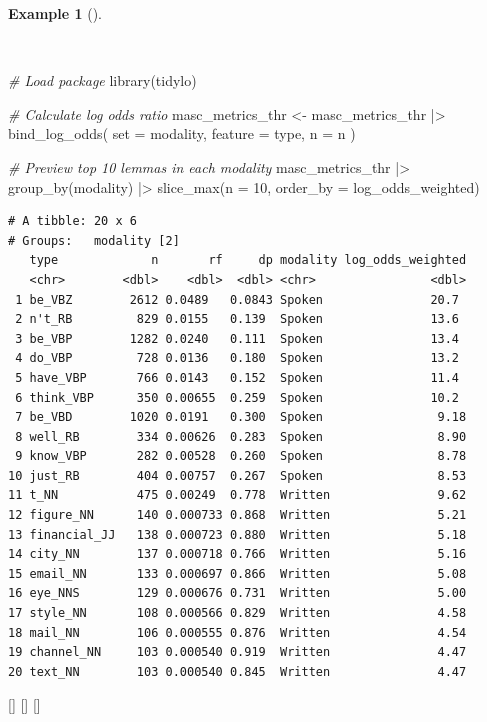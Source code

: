 \documentclass[
  letterpaper,
  krantz1]{latex/krantz-mod}
\newenvironment{Shaded}{\begin{snugshade}}{\end{snugshade}}
\newcommand{\AttributeTok}[1]{\textcolor[rgb]{0.00,0.00,0.00}{#1}}
\newcommand{\CommentTok}[1]{\textcolor[rgb]{0.00,0.00,0.00}{\textit{#1}}}
\newcommand{\DecValTok}[1]{\textcolor[rgb]{0.00,0.00,0.00}{#1}}
\newcommand{\FunctionTok}[1]{\textcolor[rgb]{0.00,0.00,0.00}{#1}}
\newcommand{\NormalTok}[1]{\textcolor[rgb]{0.00,0.00,0.00}{#1}}
\newcommand{\OtherTok}[1]{\textcolor[rgb]{0.00,0.00,0.00}{#1}}
\newcommand{\SpecialCharTok}[1]{\textcolor[rgb]{0.00,0.00,0.00}{#1}}
\newcommand{\cindex}[1]{%
  \StrSubstitute{#1}{_}{\_}[\temp]%
  \index{\temp}%
}
\theoremstyle{definition}
\theoremstyle{definition}
\newtheorem{example}{Example}[chapter]
\theoremstyle{remark}
\begin{document}
\begin{example}[]\protect\hypertarget{exm-explore-masc-log-odds-weighted}{}\label{exm-explore-masc-log-odds-weighted}

~

\begin{Shaded}
\begin{Highlighting}[numbers=left,,]
\CommentTok{\# Load package}
\FunctionTok{library}\NormalTok{(tidylo)}

\CommentTok{\# Calculate log odds ratio}
\NormalTok{masc\_metrics\_thr }\OtherTok{\textless{}{-}}
\NormalTok{  masc\_metrics\_thr }\SpecialCharTok{|\textgreater{}}
  \FunctionTok{bind\_log\_odds}\NormalTok{(}
    \AttributeTok{set =}\NormalTok{ modality,}
    \AttributeTok{feature =}\NormalTok{ type,}
    \AttributeTok{n =}\NormalTok{ n}
\NormalTok{  )}

\CommentTok{\# Preview top 10 lemmas in each modality}
\NormalTok{masc\_metrics\_thr }\SpecialCharTok{|\textgreater{}}
  \FunctionTok{group\_by}\NormalTok{(modality) }\SpecialCharTok{|\textgreater{}}
  \FunctionTok{slice\_max}\NormalTok{(}\AttributeTok{n =} \DecValTok{10}\NormalTok{, }\AttributeTok{order\_by =}\NormalTok{ log\_odds\_weighted)}
\end{Highlighting}
\end{Shaded}

\begin{verbatim}
# A tibble: 20 x 6
# Groups:   modality [2]
   type             n       rf     dp modality log_odds_weighted
   <chr>        <dbl>    <dbl>  <dbl> <chr>                <dbl>
 1 be_VBZ        2612 0.0489   0.0843 Spoken               20.7 
 2 n't_RB         829 0.0155   0.139  Spoken               13.6 
 3 be_VBP        1282 0.0240   0.111  Spoken               13.4 
 4 do_VBP         728 0.0136   0.180  Spoken               13.2 
 5 have_VBP       766 0.0143   0.152  Spoken               11.4 
 6 think_VBP      350 0.00655  0.259  Spoken               10.2 
 7 be_VBD        1020 0.0191   0.300  Spoken                9.18
 8 well_RB        334 0.00626  0.283  Spoken                8.90
 9 know_VBP       282 0.00528  0.260  Spoken                8.78
10 just_RB        404 0.00757  0.267  Spoken                8.53
11 t_NN           475 0.00249  0.778  Written               9.62
12 figure_NN      140 0.000733 0.868  Written               5.21
13 financial_JJ   138 0.000723 0.880  Written               5.18
14 city_NN        137 0.000718 0.766  Written               5.16
15 email_NN       133 0.000697 0.866  Written               5.08
16 eye_NNS        129 0.000676 0.731  Written               5.00
17 style_NN       108 0.000566 0.829  Written               4.58
18 mail_NN        106 0.000555 0.876  Written               4.54
19 channel_NN     103 0.000540 0.919  Written               4.47
20 text_NN        103 0.000540 0.845  Written               4.47
\end{verbatim}

\cindex{bind_log_odds()}\cindex{group_by()}\cindex{slice_max()}

\end{example}
\end{document}
